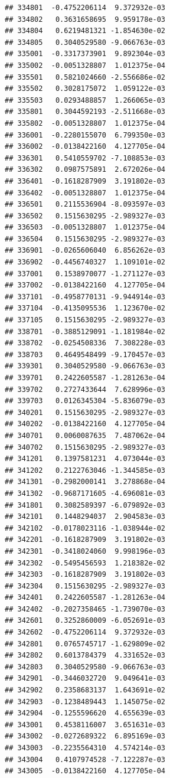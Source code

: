 \documentclass[ignorenonframetext,]{beamer}
\begin{document}
\begin{frame}[fragile]
\begin{verbatim}
## 334801  -0.4752206114  9.372932e-03
## 334802   0.3631658695  9.959178e-03
## 334804   0.6219481321 -1.854630e-02
## 334805   0.3040529580 -9.066763e-03
## 335001  -0.3317373901  9.892304e-03
## 335002  -0.0051328807  1.012375e-04
## 335501   0.5821024660 -2.556686e-02
## 335502   0.3028175072  1.059122e-03
## 335503   0.0293488857  1.266065e-03
## 335801   0.3044592193 -2.511668e-03
## 335802  -0.0051328807  1.012375e-04
## 336001  -0.2280155070  6.799350e-03
## 336002  -0.0138422160  4.127705e-04
## 336301   0.5410559702 -7.108853e-03
## 336302   0.0987575891  2.672026e-04
## 336401  -0.1618287909  3.191802e-03
## 336402  -0.0051328807  1.012375e-04
## 336501   0.2115536904 -8.093597e-03
## 336502   0.1515630295 -2.989327e-03
## 336503  -0.0051328807  1.012375e-04
## 336504   0.1515630295 -2.989327e-03
## 336901  -0.0265606040  6.856262e-03
## 336902  -0.4456740327  1.109101e-02
## 337001   0.1538970077 -1.271127e-03
## 337002  -0.0138422160  4.127705e-04
## 337101  -0.4958770131 -9.944914e-03
## 337104  -0.4135095536  1.123670e-02
## 337105   0.1515630295 -2.989327e-03
## 338701  -0.3885129091 -1.181984e-02
## 338702  -0.0254508336  7.308228e-03
## 338703   0.4649548499 -9.170457e-03
## 339301   0.3040529580 -9.066763e-03
## 339701   0.2422605587 -1.281263e-04
## 339702   0.2727433644  7.628996e-03
## 339703   0.0126345304 -5.836079e-03
## 340201   0.1515630295 -2.989327e-03
## 340202  -0.0138422160  4.127705e-04
## 340701   0.0060087635  7.487062e-04
## 340702   0.1515630295 -2.989327e-03
## 341201   0.1397581231  4.073044e-03
## 341202   0.2122763046 -1.344585e-03
## 341301  -0.2982000141  3.278868e-04
## 341302  -0.9687171605 -4.696081e-03
## 341801   0.3082589397 -6.079892e-03
## 342101   0.1448294037  2.904583e-03
## 342102  -0.0178023116 -1.038944e-02
## 342201  -0.1618287909  3.191802e-03
## 342301  -0.3418024060  9.998196e-03
## 342302  -0.5495456593  1.218382e-02
## 342303  -0.1618287909  3.191802e-03
## 342304   0.1515630295 -2.989327e-03
## 342401   0.2422605587 -1.281263e-04
## 342402  -0.2027358465 -1.739070e-03
## 342601   0.3252860009 -6.052691e-03
## 342602  -0.4752206114  9.372932e-03
## 342801   0.0765745717 -1.629809e-02
## 342802   0.6013784379  4.331652e-03
## 342803   0.3040529580 -9.066763e-03
## 342901  -0.3446032720  9.049641e-03
## 342902   0.2358683137  1.643691e-02
## 342903  -0.1238489443  1.145075e-02
## 342904  -0.1255596620  4.655639e-03
## 343001   0.4538116007  3.651631e-03
## 343002  -0.0272689322  6.895169e-03
## 343003  -0.2235564310  4.574214e-03
## 343004   0.4107974528 -7.122287e-03
## 343005  -0.0138422160  4.127705e-04

\end{verbatim}
\end{frame}
\end{document}
